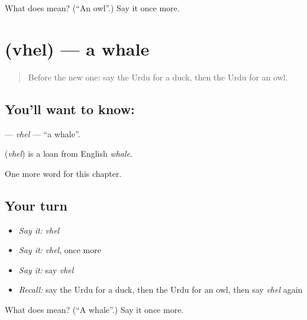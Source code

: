 \begin{tcolorbox}[breakable,colback=teal!4,colframe=teal!35!black,title={Before you move on}]
What does  mean? (\textquotedblleft{}An owl\textquotedblright{}.) Say it once more.
\end{tcolorbox}
\section[\texorpdfstring{\ur{وہیل} (vhel)}{وہیل (vhel)}]{ (vhel) — a whale}

\label{lesson:UR-C168-vhel}



\begin{quote}
Before the new one: say the Urdu for a duck, then the Urdu for an owl.
\end{quote}

\subsection*{You'll want to know: }
\textbf{} — \emph{vhel} — \textquotedblleft{}a whale\textquotedblright{}.

\begin{cousinweb}
\textbf{} (\emph{vhel}) is a loan from English \emph{whale}.
\end{cousinweb}

\begin{grammarlens}[title={What you've built}]
One more word for this chapter.
\end{grammarlens}

\subsection*{Your turn}
\begin{itemize}
\raggedright
  \item \emph{Say it:} \emph{vhel}
  \item \emph{Say it:} \emph{vhel}, once more
  \item \emph{Say it:} say \emph{vhel}
  \item \emph{Recall:} say the Urdu for a duck, then the Urdu for an owl, then say \emph{vhel} again
\end{itemize}

\begin{tcolorbox}[breakable,colback=teal!4,colframe=teal!35!black,title={Before you move on}]
What does  mean? (\textquotedblleft{}A whale\textquotedblright{}.) Say it once more.
\end{tcolorbox}
